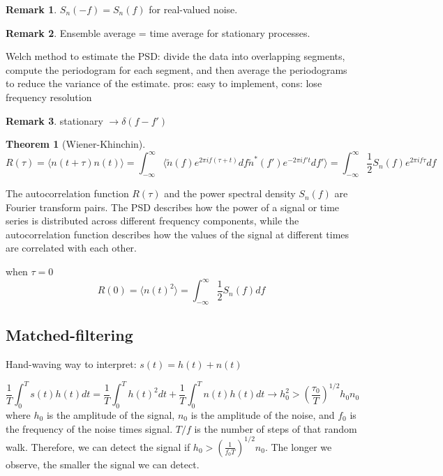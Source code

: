 \documentclass[12pt, a4paper]{article}
\newcounter{lecture}              %
\theoremstyle{plain} %
\newtheorem{theorem}{Theorem}[lecture]      %
\theoremstyle{definition} %
\newtheorem{remark}{Remark}[lecture]
\begin{document}
\begin{remark}
    $S_n (-f) = S_n(f)$ for real-valued noise.
\end{remark}

\begin{remark}
    Ensemble average = time average for stationary processes.
\end{remark}

Welch method to estimate the PSD: divide the data into overlapping segments, compute the periodogram for each segment, and then average the periodograms to reduce the variance of the estimate.
pros: easy to implement, cons: lose frequency resolution

\begin{remark}
    stationary $\rightarrow \delta(f-f')$
\end{remark}

\begin{theorem}[Wiener-Khinchin]
    \[ 
        R(\tau) = \langle n(t+\tau)n(t)\rangle = 
        \int_{-\infty}^{\infty} \langle \tilde{n}(f) e^{2\pi i f (\tau+t)} df \tilde{n}^\ast(f') e^{-2\pi i f' t} df' \rangle = \int_{-\infty}^{\infty} \frac{1}{2}S_n(f) e^{2\pi i f \tau} df
    \]
\end{theorem}
The autocorrelation function $R(\tau)$ and the power spectral density $S_n(f)$ are Fourier transform pairs. The PSD describes how the power of a signal or time series is distributed across different frequency components, while the autocorrelation function describes how the values of the signal at different times are correlated with each other.

when $\tau=0$
\begin{equation}
    R(0) = \langle n(t)^2 \rangle = \int_{-\infty}^{\infty} \frac{1}{2} S_n(f) df
\end{equation}


\subsection*{Matched-filtering}
Hand-waving way to interpret:
$s(t) = h(t) + n(t)$

\begin{equation}
    \frac{1}{T} \int_{0}^{T} s(t) h(t) dt = \frac{1}{T} \int_{0}^{T} h(t)^2 dt + \frac{1}{T} \int_{0}^{T} n(t) h(t) dt \rightarrow h_0^2  > \left(\frac{\tau_0}{T}\right)^{1/2} h_0 n_0
\end{equation}
where $h_0$ is the amplitude of the signal, $n_0$ is the amplitude of the noise, and $f_0$ is the frequency of the noise times signal. $T/f$ is the number of steps of that random walk. Therefore, we can detect the signal if $h_0 > \left(\frac{1}{f_0T}\right)^{1/2} n_0$. The longer we observe, the smaller the signal we can detect.
\end{document}
